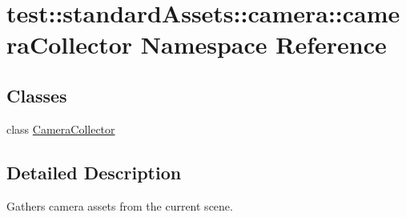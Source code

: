 \hypertarget{namespacetest_1_1standardAssets_1_1camera_1_1cameraCollector}{\section{test\-:\-:standard\-Assets\-:\-:camera\-:\-:camera\-Collector \-Namespace \-Reference}
\label{d7/dd5/namespacetest_1_1standardAssets_1_1camera_1_1cameraCollector}
}
\subsection*{\-Classes}
\begin{DoxyCompactItemize}
\item 
class \hyperlink{classtest_1_1standardAssets_1_1camera_1_1cameraCollector_1_1CameraCollector}{\-Camera\-Collector}
\end{DoxyCompactItemize}


\subsection{\-Detailed \-Description}
\begin{DoxyVerb}
Gathers camera assets from the current scene.
\end{DoxyVerb}
 